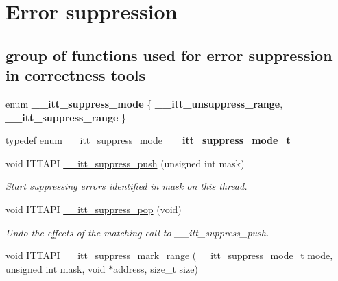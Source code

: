 \hypertarget{group__suppress}{}\section{Error suppression}
\label{group__suppress}
\subsection*{group of functions used for error suppression in correctness tools}
\begin{DoxyCompactItemize}
\item 
\hypertarget{group__suppress_ga2f22a362ce18331383ba16fea9d9b94d}{}enum {\bfseries \+\_\+\+\_\+itt\+\_\+suppress\+\_\+mode} \{ {\bfseries \+\_\+\+\_\+itt\+\_\+unsuppress\+\_\+range}, 
{\bfseries \+\_\+\+\_\+itt\+\_\+suppress\+\_\+range}
 \}\label{group__suppress_ga2f22a362ce18331383ba16fea9d9b94d}

\item 
\hypertarget{group__suppress_ga63fa4a192bd1e53599c2e58fe4527b5a}{}typedef enum \+\_\+\+\_\+itt\+\_\+suppress\+\_\+mode {\bfseries \+\_\+\+\_\+itt\+\_\+suppress\+\_\+mode\+\_\+t}\label{group__suppress_ga63fa4a192bd1e53599c2e58fe4527b5a}

\item 
\hypertarget{group__suppress_gaee6d74a43f8ae7e60b397e103d973946}{}void I\+T\+T\+A\+P\+I \hyperlink{group__suppress_gaee6d74a43f8ae7e60b397e103d973946}{\+\_\+\+\_\+itt\+\_\+suppress\+\_\+push} (unsigned int mask)\label{group__suppress_gaee6d74a43f8ae7e60b397e103d973946}

\begin{DoxyCompactList}\small\item\em Start suppressing errors identified in mask on this thread. \end{DoxyCompactList}\item 
\hypertarget{group__suppress_ga5036bae7bba4aac6b63795f1566d7fc2}{}void I\+T\+T\+A\+P\+I \hyperlink{group__suppress_ga5036bae7bba4aac6b63795f1566d7fc2}{\+\_\+\+\_\+itt\+\_\+suppress\+\_\+pop} (void)\label{group__suppress_ga5036bae7bba4aac6b63795f1566d7fc2}

\begin{DoxyCompactList}\small\item\em Undo the effects of the matching call to \+\_\+\+\_\+itt\+\_\+suppress\+\_\+push. \end{DoxyCompactList}\item 
\hypertarget{group__suppress_gad71a60677f91afc54978e840170a71fd}{}void I\+T\+T\+A\+P\+I \hyperlink{group__suppress_gad71a60677f91afc54978e840170a71fd}{\+\_\+\+\_\+itt\+\_\+suppress\+\_\+mark\+\_\+range} (\+\_\+\+\_\+itt\+\_\+suppress\+\_\+mode\+\_\+t mode, unsigned int mask, void $\ast$address, size\+\_\+t size)\label{group__suppress_gad71a60677f91afc54978e840170a71fd}


\end{DoxyCompactItemize}
